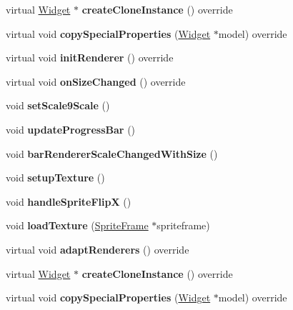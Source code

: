 \begin{DoxyCompactItemize}
virtual \hyperlink{classui_1_1Widget}{Widget} $\ast$ {\bfseries create\+Clone\+Instance} () override
\item 
\mbox{\label{classui_1_1LoadingBar_a11a6073a2fbb58c393a9c4c208aaec0e}} 
virtual void {\bfseries copy\+Special\+Properties} (\hyperlink{classui_1_1Widget}{Widget} $\ast$model) override
\item 
\mbox{\label{classui_1_1LoadingBar_a63e5a7d501b5236abd842845e48bfc86}} 
virtual void {\bfseries init\+Renderer} () override
\item 
\mbox{\label{classui_1_1LoadingBar_a01c061a0eae8b4ae6a87d03108a43051}} 
virtual void {\bfseries on\+Size\+Changed} () override
\item 
\mbox{\label{classui_1_1LoadingBar_a5acb157107db30feb6de6da765876b06}} 
void {\bfseries set\+Scale9\+Scale} ()
\item 
\mbox{\label{classui_1_1LoadingBar_a645b86aba1ad5ff8cf62fa35fe93875a}} 
void {\bfseries update\+Progress\+Bar} ()
\item 
\mbox{\label{classui_1_1LoadingBar_acce2f24249cdf7821af3df3947ef3405}} 
void {\bfseries bar\+Renderer\+Scale\+Changed\+With\+Size} ()
\item 
\mbox{\label{classui_1_1LoadingBar_aed719a8122f9eb98daef776075f3b580}} 
void {\bfseries setup\+Texture} ()
\item 
\mbox{\label{classui_1_1LoadingBar_ace25157bdfa2b668a0426dfcf5abdf1c}} 
void {\bfseries handle\+Sprite\+FlipX} ()
\item 
\mbox{\label{classui_1_1LoadingBar_aee2017a5ad5d564eb65c98c746db0583}} 
void {\bfseries load\+Texture} (\hyperlink{classSpriteFrame}{Sprite\+Frame} $\ast$spriteframe)
\item 
\mbox{\label{classui_1_1LoadingBar_ac01324ceac9b338cb8950800ff263c0e}} 
virtual void {\bfseries adapt\+Renderers} () override
\item 
\mbox{\label{classui_1_1LoadingBar_ac4b11b86bef1cab730279c06f7bccd72}} 
virtual \hyperlink{classui_1_1Widget}{Widget} $\ast$ {\bfseries create\+Clone\+Instance} () override
\item 
\mbox{\label{classui_1_1LoadingBar_acd2f3310e74f15d71ac511a855f8df4e}} 
virtual void {\bfseries copy\+Special\+Properties} (\hyperlink{classui_1_1Widget}{Widget} $\ast$model) override
\end{DoxyCompactItemize}
